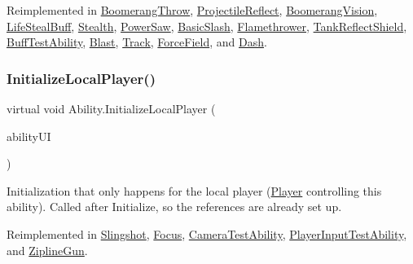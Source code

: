 Reimplemented in \hyperlink{class_boomerang_throw_a757453f2578bc791773b5767eb80f39d}{Boomerang\+Throw}, \hyperlink{class_projectile_reflect_a5381a035271121930793086fc05f86c4}{Projectile\+Reflect}, \hyperlink{class_boomerang_vision_ab7ad2e1f439267cfdb0aeedcc749c06e}{Boomerang\+Vision}, \hyperlink{class_life_steal_buff_abdd7a4fb4aaceaae6eaae37c29de24cc}{Life\+Steal\+Buff}, \hyperlink{class_stealth_a3483f2663cee9ce06b7a6cd2675b6fc9}{Stealth}, \hyperlink{class_power_saw_ac695198ffe590b908e1c0c85f63fb792}{Power\+Saw}, \hyperlink{class_basic_slash_afc9c8ccb32b322317f157f9a5d06e925}{Basic\+Slash}, \hyperlink{class_flamethrower_a825b0e637ff46bd9b75c9d4705d194de}{Flamethrower}, \hyperlink{class_tank_reflect_shield_a3e2249b4918a8b93ac770d74adf03044}{Tank\+Reflect\+Shield}, \hyperlink{class_buff_test_ability_a205cdf654967c0884499c1cf15a92c7c}{Buff\+Test\+Ability}, \hyperlink{class_blast_a1c0b1bd2d101c05fdbe09d32a5c5c44a}{Blast}, \hyperlink{class_track_a87f3127370608a55c44203b8551e01e4}{Track}, \hyperlink{class_force_field_aed1ced1b7f1ddb9b0a8f0b8322b2eda1}{Force\+Field}, and \hyperlink{class_dash_a20f3651241a3bd4b1fd29c00eef4b8f6}{Dash}.

\hypertarget{class_ability_ae8217a23a940c9ce450e827856d7020b}{}\label{class_ability_ae8217a23a940c9ce450e827856d7020b} 
\subsubsection{\texorpdfstring{Initialize\+Local\+Player()}{InitializeLocalPlayer()}}
{\footnotesize\ttfamily virtual void Ability.\+Initialize\+Local\+Player (\begin{DoxyParamCaption}\item[{\hyperlink{class_ability_u_i}{Ability\+UI}}]{ability\+UI }\end{DoxyParamCaption})\hspace{0.3cm}{\ttfamily [virtual]}}



Initialization that only happens for the local player (\hyperlink{class_player}{Player} controlling this ability). Called after Initialize, so the references are already set up. 



Reimplemented in \hyperlink{class_slingshot_a449e53a29fab847e65cb55fc3ee4490e}{Slingshot}, \hyperlink{class_focus_a5f64f51f4074500f2572dea35eec1610}{Focus}, \hyperlink{class_camera_test_ability_ad60de19016609c34f802f6d7eff6b7c8}{Camera\+Test\+Ability}, \hyperlink{class_player_input_test_ability_a8ac71832a1fd267f30881d969767ca16}{Player\+Input\+Test\+Ability}, and \hyperlink{class_zipline_gun_a6f753a0b89e7fd852b5a81b041f64ac1}{Zipline\+Gun}.

